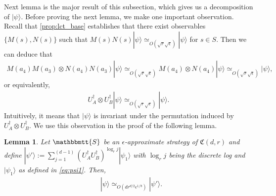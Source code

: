 \documentclass[11pt,letterpaper]{article}
\newcommand{\ket}[1]{|#1\rangle}
\newcommand{\x}{\otimes}
\newcommand{\ct}{^{\dagger}}
\newcommand{\1}{\mathbb{1}}
\newcommand{\fC}{\mathfrak{C}}
\newcommand{\bS}{\mathbbmtt{S}}
\newcommand{\ep}{\epsilon}
\newcommand{\se}{\sqrt{\epsilon}}
\newcommand{\sr}{\sqrt{r}}
\newcommand{\appd}[1]{\simeq_{#1}}
\newtheorem{lemma}[theorem]{Lemma}
\theoremstyle{definition}
\begin{document}
Next lemma is the major result of this subsection, which gives us a decomposition of $\ket{\psi}$.
Before proving the next lemma, we make one important observation.
Recall that \cref{prop:lct_base} establishes that there exist observables $\{M(s), N(s)\}$ such that 
$M(s)N(s) \ket{\psi} \appd{O(\sr\se)} \ket{\psi}$ for $s \in S$.
Then we can deduce that 
\begin{align*}
	M(a_4)M(a_3) \x N(a_4)N(a_3) \ket{\psi} \appd{O(\sr\se)} M(a_4) \x N(a_4) \ket{\psi} \appd{O(\sr\se)} \ket{\psi},
\end{align*}
or equivalently,
\begin{align*}
	U_A\ct \x U_B\ct \ket{\psi} \appd{O(\sr\se)} \ket{\psi}.
\end{align*}
Intuitively, it means that $\ket{\psi}$ is invariant under the permutation induced by $U_A\ct \x U_B\ct$.
We use this observation in the proof of the following lemma.
\begin{lemma}
\label{lm:decomp_psi}
Let $\bS$ be an $\ep$-approximate strategy of $\fC(d,r)$ and 
define 
$\ket{\psi'} := \sum_{j=1}^{(d-1)} (U_A\ct U_B\ct)^{\log_r j} \ket{\psi_1}$
with $\log_r j$ being the discrete log and
$\ket{\psi_1}$ as defined in \cref{eq:psi1}.
Then,
\begin{align}
	&\ket{\psi} \appd{O(d r^{d/2} \ep^{1/8})} \ket{\psi'}.
\end{align}
\end{lemma}
\end{document}
